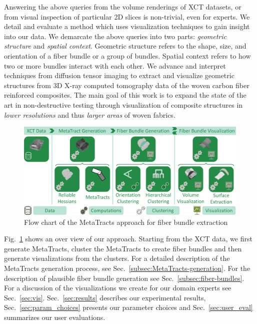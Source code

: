 Answering the above queries from the volume renderings of XCT datasets, or from visual inspection of particular 2D slices is non-trivial, even for experts. We detail and evaluate a method which uses visualization techniques to gain insight into our data. We demarcate the above queries into two parts: \textit{geometric structure} and \textit{spatial context}. Geometric structure refers to the shape, size, and orientation of a fiber bundle or a group of bundles. Spatial context refers to how two or more bundles interact with each other. 
We advance and interpret techniques from diffusion tensor imaging to extract and visualize geometric structures from 3D X-ray computed tomography data of the woven carbon fiber reinforced composites. The main goal of this work is to expand the state of the art in non-destructive testing through visualization of composite structures in \textit{lower resolutions} and thus \textit{larger areas} of woven fabrics.
\begin{figure}[tb]
	\centering
	\includegraphics[width=\linewidth]{images_pvis/workflow.pdf}
	\caption{Flow chart of the MetaTracts approach for fiber bundle extraction}
	\label{fig:flowchart}
\end{figure}
Fig.~\ref{fig:flowchart} shows an over view of our approach. Starting from the XCT data, we first generate MetaTracts, cluster the MetaTracts to create fiber bundles and then generate visualizations from the clusters. For a detailed description of the MetaTracts generation process, see Sec.~\ref{subsec:MetaTracts-generation}. For the description of plausible fiber bundle generation see Sec.~\ref{subsec:fiber-bundles}. For a discussion of the visualizations we create for our domain experts see Sec.~\ref{sec:vis}. Sec.~\ref{sec:results} describes our experimental results, Sec.~\ref{sec:param_choices} presents our parameter choices and  Sec.~\ref{sec:user_eval} summarizes our user evaluations.



